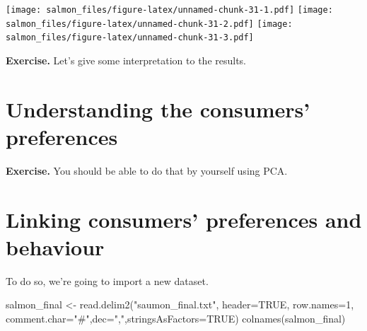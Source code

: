 \documentclass[
]{book}
\newenvironment{Shaded}{\begin{snugshade}}{\end{snugshade}}
\newcommand{\AttributeTok}[1]{\textcolor[rgb]{0.77,0.63,0.00}{#1}}
\newcommand{\ConstantTok}[1]{\textcolor[rgb]{0.00,0.00,0.00}{#1}}
\newcommand{\DecValTok}[1]{\textcolor[rgb]{0.00,0.00,0.81}{#1}}
\newcommand{\FunctionTok}[1]{\textcolor[rgb]{0.00,0.00,0.00}{#1}}
\newcommand{\NormalTok}[1]{#1}
\newcommand{\OtherTok}[1]{\textcolor[rgb]{0.56,0.35,0.01}{#1}}
\newcommand{\SpecialCharTok}[1]{\textcolor[rgb]{0.00,0.00,0.00}{#1}}
\newcommand{\StringTok}[1]{\textcolor[rgb]{0.31,0.60,0.02}{#1}}
\begin{document}
\texttt{[image: salmon\_files/figure-latex/unnamed-chunk-31-1.pdf]} \texttt{[image: salmon\_files/figure-latex/unnamed-chunk-31-2.pdf]} \texttt{[image: salmon\_files/figure-latex/unnamed-chunk-31-3.pdf]}

\textbf{Exercise. }Let's give some interpretation to the results.

\begin{Shaded}
\end{Shaded}

\hypertarget{understanding-the-consumers-preferences}{%
\section{Understanding the consumers' preferences}\label{understanding-the-consumers-preferences}}

\textbf{Exercise. }You should be able to do that by yourself using PCA.

\hypertarget{linking-consumers-preferences-and-behaviour}{%
\section{Linking consumers' preferences and behaviour}\label{linking-consumers-preferences-and-behaviour}}

To do so, we're going to import a new dataset.

\begin{Shaded}
\begin{Highlighting}[]
\NormalTok{salmon\_final }\OtherTok{\textless{}{-}} \FunctionTok{read.delim2}\NormalTok{(}\StringTok{"saumon\_final.txt"}\NormalTok{, }\AttributeTok{header=}\ConstantTok{TRUE}\NormalTok{, }\AttributeTok{row.names=}\DecValTok{1}\NormalTok{, }\AttributeTok{comment.char=}\StringTok{"\#"}\NormalTok{,}\AttributeTok{dec=}\StringTok{","}\NormalTok{,}\AttributeTok{stringsAsFactors=}\ConstantTok{TRUE}\NormalTok{)}
\FunctionTok{colnames}\NormalTok{(salmon\_final)}
\end{Highlighting}
\end{Shaded}
\end{document}
